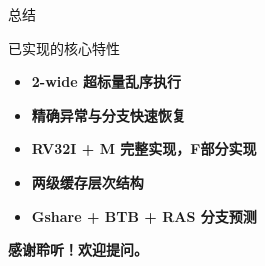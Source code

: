 \documentclass[aspectratio=169,xcolor={dvipsnames,svgnames},10pt]{beamer}
\begin{document}
\begin{frame}{总结}
  \vfill
  \begin{center}
    \begin{minipage}{0.78\textwidth}
      \begin{block}{已实现的核心特性}
        \raggedright
        \begin{itemize}
          \item \textbf{2-wide 超标量乱序执行}\\
          \item \textbf{精确异常与分支快速恢复}\\
          \item \textbf{RV32I + M 完整实现，F部分实现}\\
          \item \textbf{两级缓存层次结构}\\
          \item \textbf{Gshare + BTB + RAS 分支预测}\\
        \end{itemize}
      \end{block}
    \end{minipage}
  \end{center}
  \vspace{0.2cm}
  \begin{center}
    \large\textcolor{PrimaryBlue}{\textbf{感谢聆听！欢迎提问。}}
  \end{center}
  \vfill
\end{frame}

\appendix
\end{document}
